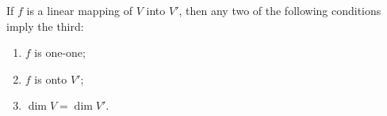 If $f$ is a linear mapping of $V$ into $V'$, then any two of the following conditions imply the third:
\begin{enumerate}
\item $f$ is one-one;
\item $f$ is onto $V'$;
\item $\dim V = \dim V'$.
\end{enumerate}
